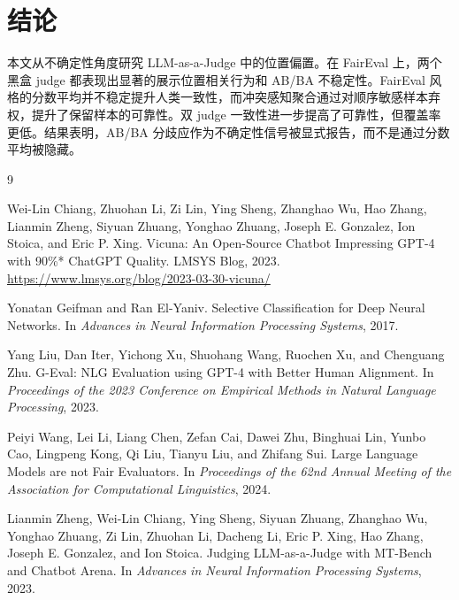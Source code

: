 \documentclass[11pt]{ctexart}
\begin{document}
\section{结论}

本文从不确定性角度研究 LLM-as-a-Judge 中的位置偏置。在 FairEval 上，两个黑盒 judge 都表现出显著的展示位置相关行为和 AB/BA 不稳定性。FairEval 风格的分数平均并不稳定提升人类一致性，而冲突感知聚合通过对顺序敏感样本弃权，提升了保留样本的可靠性。双 judge 一致性进一步提高了可靠性，但覆盖率更低。结果表明，AB/BA 分歧应作为不确定性信号被显式报告，而不是通过分数平均被隐藏。

\begin{thebibliography}{9}

Wei-Lin Chiang, Zhuohan Li, Zi Lin, Ying Sheng, Zhanghao Wu, Hao Zhang, Lianmin Zheng, Siyuan Zhuang, Yonghao Zhuang, Joseph E. Gonzalez, Ion Stoica, and Eric P. Xing.
\newblock Vicuna: An Open-Source Chatbot Impressing GPT-4 with 90\%* ChatGPT Quality.
\newblock LMSYS Blog, 2023.
\newblock \url{https://www.lmsys.org/blog/2023-03-30-vicuna/}

Yonatan Geifman and Ran El-Yaniv.
\newblock Selective Classification for Deep Neural Networks.
\newblock In \emph{Advances in Neural Information Processing Systems}, 2017.

Yang Liu, Dan Iter, Yichong Xu, Shuohang Wang, Ruochen Xu, and Chenguang Zhu.
\newblock G-Eval: NLG Evaluation using GPT-4 with Better Human Alignment.
\newblock In \emph{Proceedings of the 2023 Conference on Empirical Methods in Natural Language Processing}, 2023.

Peiyi Wang, Lei Li, Liang Chen, Zefan Cai, Dawei Zhu, Binghuai Lin, Yunbo Cao, Lingpeng Kong, Qi Liu, Tianyu Liu, and Zhifang Sui.
\newblock Large Language Models are not Fair Evaluators.
\newblock In \emph{Proceedings of the 62nd Annual Meeting of the Association for Computational Linguistics}, 2024.

Lianmin Zheng, Wei-Lin Chiang, Ying Sheng, Siyuan Zhuang, Zhanghao Wu, Yonghao Zhuang, Zi Lin, Zhuohan Li, Dacheng Li, Eric P. Xing, Hao Zhang, Joseph E. Gonzalez, and Ion Stoica.
\newblock Judging LLM-as-a-Judge with MT-Bench and Chatbot Arena.
\newblock In \emph{Advances in Neural Information Processing Systems}, 2023.

\end{thebibliography}
\end{document}
